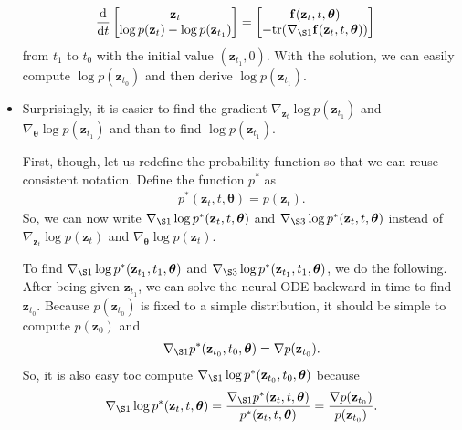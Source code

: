 \documentclass[10pt]{article}
\newcommand{\dee}{\mathrm{d}}
\newcommand{\ve}[1]{\mathbf{#1}}
\newcommand{\ves}[1]{\boldsymbol{#1}}
\newcommand{\tr}{\mathrm{tr}}
\begin{document}
\begin{itemize}
\begin{align*}
    \frac{\dee}{\dee t} \begin{bmatrix}
      \ve{z}_t \\
      \log p(\ve{z}_t) - \log p(\ve{z}_{t_1})
    \end{bmatrix}
    &= \begin{bmatrix}
      \ve{f}(\ve{z}_t, t, \ves{\theta}) \\
      -\tr(\nabla_{\S1}\ve{f}(\ve{z}_t, t, \ves{\theta}))
    \end{bmatrix}
  \end{align*}
  from $t_1$ to $t_0$ with the initial value $(\ve{z}_{t_1}, 0)$. With the solution, we can easily compute $\log p(\ve{z}_{t_0})$ and then derive $\log p(\ve{z}_{t_1})$.

  \item Surprisingly, it is easier to find the gradient $\nabla_{\ve{z}_t} \log p(\ve{z}_{t_1})$ and $\nabla_{\ves{\theta}} \log p(\ve{z}_{t_1})$ and than to find $\log p(\ve{z}_{t_1})$. 
  
  First, though, let us redefine the probability function so that we can reuse consistent notation. Define the function $p^*$ as \begin{align*}
    p^*(\ve{z}_t, t, \ves{\theta}) = p(\ve{z}_t).
  \end{align*}
  So, we can now write $\nabla_{\S1} \log p^*(\ve{z}_t, t, \ves{\theta})$ and $\nabla_{\S3} \log p^*(\ve{z}_t, t, \ves{\theta})$ instead of $\nabla_{\ve{z}_t} \log p(\ve{z}_{t})$ and $\nabla_{\ves{\theta}} \log p(\ve{z}_{t})$.

  To find $\nabla_{\S1} \log p^*(\ve{z}_{t_1}, t_1, \ves{\theta})$ and $\nabla_{\S3} \log p^*(\ve{z}_{t_1}, t_1, \ves{\theta})$, we do the following. After being given $\ve{z}_{t_1}$, we can solve the neural ODE backward in time to find $\ve{z}_{t_0}$. Because $p(\ve{z}_{t_0})$ is fixed to a simple distribution, it should be simple to compute $p(\ve{z}_0)$ and
  \begin{align*}
    \nabla_{\S1}p^*(\ve{z}_{t_0}, t_0, \ves{\theta}) = \nabla p(\ve{z}_{t_0}).
  \end{align*}
  So, it is also easy toc compute $\nabla_{\S1} \log p^*(\ve{z}_{t_0}, t_0, \ves{\theta})$ because
  \begin{align*}
    \nabla_{\S1} \log p^*(\ve{z}_t, t, \ves{\theta}) 
    = \frac{\nabla_{\S1} p^*(\ve{z}_t, t, \ves{\theta})}{p^*(\ve{z}_t, t, \ves{\theta})}
    = \frac{\nabla p(\ve{z}_{t_0})}{p(\ve{z}_{t_0})}.
  \end{align*}


\end{itemize}
\end{document}
